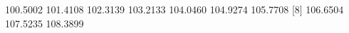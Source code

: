 \begin{Schunk}
% --begin: "frbe"
\begin{Soutput}
 [1] 100.5002 101.4108 102.3139 103.2133 104.0460 104.9274 105.7708
 [8] 106.6504 107.5235 108.3899
\end{Soutput}
%
% --end: "frbe"
\end{Schunk}
